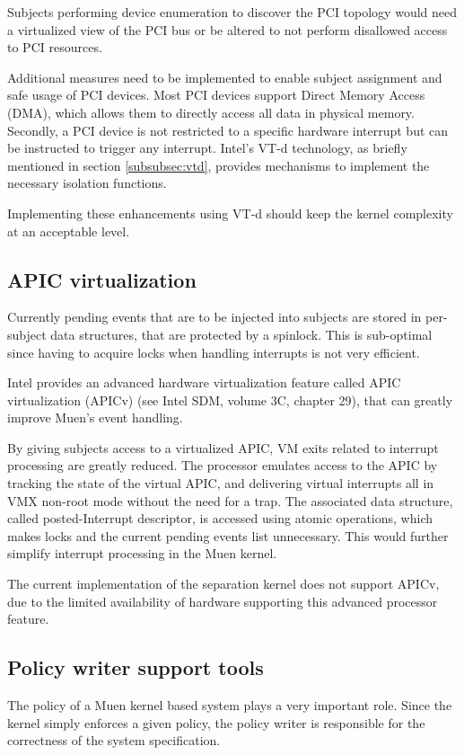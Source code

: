 Subjects performing device enumeration to discover the PCI topology would need
a virtualized view of the PCI bus or be altered to not perform disallowed access
to PCI resources.

Additional measures need to be implemented to enable subject assignment and safe
usage of PCI devices. Most PCI devices support Direct Memory Access (DMA), which
allows them to directly access all data in physical memory. Secondly, a PCI
device is not restricted to a specific hardware interrupt but can be instructed
to trigger any interrupt. Intel's VT-d technology, as briefly mentioned in
section \ref{subsubsec:vtd}, provides mechanisms to implement the necessary
isolation functions.

Implementing these enhancements using VT-d should keep the kernel complexity at
an acceptable level.

\subsection{APIC virtualization}\label{subsec:apicv}
Currently pending events that are to be injected into subjects are stored in
per-subject data structures, that are protected by a spinlock. This is
sub-optimal since having to acquire locks when handling interrupts is not very
efficient.

Intel provides an advanced hardware virtualization feature called APIC
virtualization (APICv) (see Intel SDM, volume 3C, chapter 29), that can greatly
improve Muen's event handling.

By giving subjects access to a virtualized APIC, VM exits related to interrupt
processing are greatly reduced. The processor emulates access to the APIC by
tracking the state of the virtual APIC, and delivering virtual interrupts all in
VMX non-root mode without the need for a trap. The associated data structure,
called posted-Interrupt descriptor, is accessed using atomic operations, which
makes locks and the current pending events list unnecessary. This would further
simplify interrupt processing in the Muen kernel.

The current implementation of the separation kernel does not support APICv, due
to the limited availability of hardware supporting this advanced processor
feature.

\subsection{Policy writer support tools}
The policy of a Muen kernel based system plays a very important role. Since the
kernel simply enforces a given policy, the policy writer is responsible for the
correctness of the system specification.


